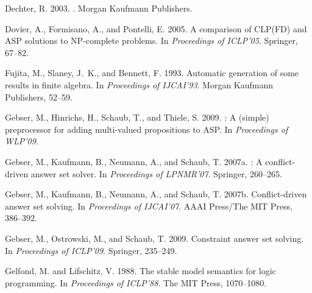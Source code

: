 \documentclass{tlp}
\begin{document}
\begin{thebibliography}{}
{\sc Dechter, R.} 2003.
.
\newblock Morgan Kaufmann Publishers.

{\sc Dovier, A.}, {\sc Formisano, A.}, {\sc and} {\sc Pontelli, E.} 2005.
\newblock A comparison of {CLP(FD)} and {ASP} solutions to {NP}-complete
  problems.
\newblock In {\em Proceedings of ICLP'05}. Springer, 67--82.

{\sc Fujita, M.}, {\sc Slaney, J.~K.}, {\sc and} {\sc Bennett, F.} 1993.
\newblock Automatic generation of some results in finite algebra.
\newblock In {\em Proceedings of IJCAI'93}. Morgan Kaufmann Publishers, 52--59.

{\sc Gebser, M.}, {\sc Hinrichs, H.}, {\sc Schaub, T.}, {\sc and} {\sc Thiele,
  S.} 2009.
: A (simple) preprocessor for adding multi-valued
  propositions to {ASP}.
\newblock In {\em Proceedings of WLP'09}.

{\sc Gebser, M.}, {\sc Kaufmann, B.}, {\sc Neumann, A.}, {\sc and} {\sc Schaub,
  T.} 2007a.
: A conflict-driven answer set solver.
\newblock In {\em Proceedings of LPNMR'07}. Springer, 260--265.

{\sc Gebser, M.}, {\sc Kaufmann, B.}, {\sc Neumann, A.}, {\sc and} {\sc Schaub,
  T.} 2007b.
\newblock Conflict-driven answer set solving.
\newblock In {\em Proceedings of IJCAI'07}. AAAI Press/The MIT Press, 386--392.

{\sc Gebser, M.}, {\sc Ostrowski, M.}, {\sc and} {\sc Schaub, T.} 2009.
\newblock Constraint answer set solving.
\newblock In {\em Proceedings of ICLP'09}. Springer, 235--249.

{\sc Gelfond, M.} {\sc and} {\sc Lifschitz, V.} 1988.
\newblock The stable model semantics for logic programming.
\newblock In {\em Proceedings of ICLP'88}. The MIT Press, 1070--1080.


\end{thebibliography}
\end{document}
